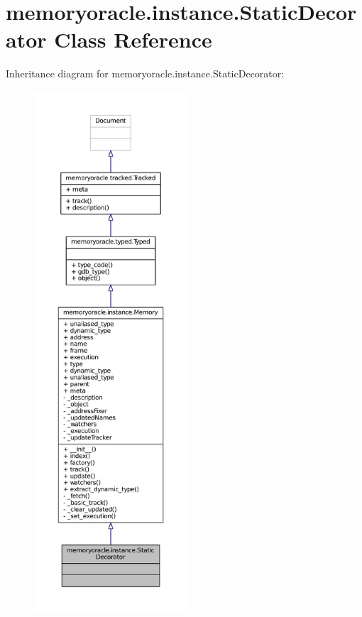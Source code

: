 \hypertarget{classmemoryoracle_1_1instance_1_1StaticDecorator}{}\section{memoryoracle.\+instance.\+Static\+Decorator Class Reference}
\label{classmemoryoracle_1_1instance_1_1StaticDecorator}


Inheritance diagram for memoryoracle.\+instance.\+Static\+Decorator\+:
\nopagebreak
\begin{figure}[H]
\begin{center}
\leavevmode
\includegraphics[height=550pt]{classmemoryoracle_1_1instance_1_1StaticDecorator__inherit__graph}
\end{center}
\end{figure}



